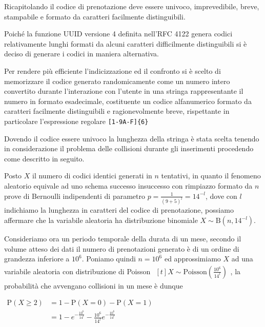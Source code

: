 Ricapitolando il codice di prenotazione deve essere univoco, imprevedibile,
breve, stampabile e formato da caratteri facilmente distinguibili.

Poiché la funzione UUID versione 4 definita nell'RFC 4122 genera codici
relativamente lunghi formati da alcuni caratteri difficilmente distinguibili
si è deciso di generare i codici in maniera alternativa.

Per rendere più efficiente l'indicizzazione ed il confronto si è scelto di
memorizzare il codice generato randomicamente come un numero intero convertito
durante l'interazione con l'utente in una stringa rappresentante il numero in
formato esadecimale, costituente un codice alfanumerico formato da caratteri
facilmente distinguibili e ragionevolmente breve, rispettante in particolare
l'espressione regolare \verb|[1-9A-F]{6}|

Dovendo il codice essere univoco la lunghezza della stringa è stata scelta
tenendo in considerazione il problema delle collisioni durante gli inserimenti
procedendo come descritto in seguito.

Posto $X$ il numero di codici identici generati in $n$ tentativi, in quanto
il fenomeno aleatorio equivale ad uno schema successo insuccesso con rimpiazzo
formato da $n$ prove di Bernoulli indipendenti di parametro
$p = \frac{1}{\left( 9 + 5 \right)^l} = 14^{-l}$,
dove con $l$ indichiamo la lunghezza in caratteri del codice di prenotazione,
possiamo affermare che la variabile aleatoria ha distribuzione binomiale
$X \sim \mathrm{B}\left( n, 14^{-l} \right)$.

Consideriamo ora un periodo temporale della durata di un mese, secondo il volume
atteso dei dati il numero di prenotazioni generato è di un ordine di grandezza
inferiore a $10^6$. Poniamo quindi $n = 10^6$ ed approssimiamo $X$ ad una
variabile aleatoria con distribuzione di Poisson
$\begin{aligned}[t]
        X \sim \mathrm{Poisson}\left( \frac{10^6}{14^l} \right)
    \end{aligned}$,
la probabilità che avvengano collisioni in un mese è dunque

$\begin{aligned}
        \mathrm{P}\left( X \geq 2 \right)
         & = 1 - \mathrm{P}\left( X = 0 \right)
        - \mathrm{P}\left( X = 1 \right)           \\
         & = 1 - e^{-\frac{10^6}{14^l}}
        - \frac{10^6}{14^l} e^{-\frac{10^6}{14^l}} \\
    \end{aligned}$

